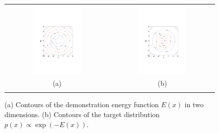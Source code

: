 \documentclass{article} %
\begin{document}
\begin{figure}[h]
\setlength{\tabcolsep}{0em}
\vspace{-1mm}
\begin{center}
\begin{tabular}{cc}
\includegraphics[trim={3.2cm 6cm 3.2cm 9cm},clip,width=0.49\textwidth]{../plots3/energy_contour.pdf}
& \includegraphics[trim={3.2cm 6cm 3.2cm 9cm},clip,width=0.49\textwidth]{../plots3/dist_contour.pdf} 
\vspace{-3.5mm}
\\
   \footnotesize(a) 
& \footnotesize(b) 
\\
\multicolumn{2}{c}{}
\end{tabular}
\end{center}
\vspace{-8mm}
\caption{\footnotesize
(a) Contours of the demonstration energy function $E(x)$ in two dimensions. (b) Contours of the target distribution $p(x)\propto \exp(-E(x))$.}
\label{fig:sup.model}
\vspace{-10pt}
\end{figure}
\end{document}
